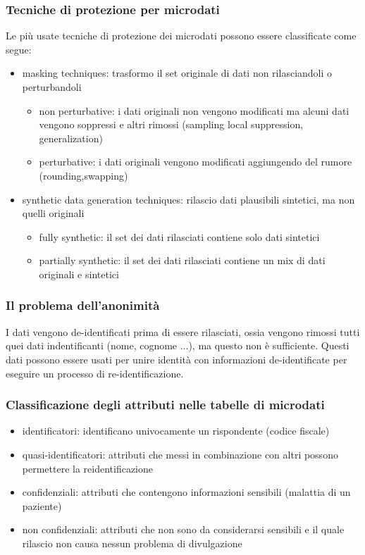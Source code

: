 \subsubsection{Tecniche di protezione per microdati}
Le più usate tecniche di protezione dei microdati possono essere classificate come segue:
\begin{itemize}
    \item masking techniques: trasformo il set originale di dati non rilasciandoli o perturbandoli
    \begin{itemize}
        \item non perturbative: i dati originali non vengono modificati ma alcuni dati vengono soppressi e altri rimossi (sampling local suppression, generalization)
        \item perturbative: i dati originali vengono modificati aggiungendo del rumore (rounding,swapping)
    \end{itemize}
    \item synthetic data generation techniques: rilascio dati plausibili sintetici, ma non quelli originali
    \begin{itemize}
        \item fully synthetic: il set dei dati rilasciati contiene solo dati sintetici
        \item partially synthetic: il set dei dati rilasciati contiene un mix di dati originali e sintetici
    \end{itemize}
\end{itemize}

\subsubsection{Il problema dell'anonimità}
I dati vengono de-identificati prima di essere rilasciati, ossia vengono rimossi tutti quei dati indentificanti (nome, cognome ...), ma questo non è sufficiente. Questi dati possono essere usati per unire identità con informazioni de-identificate per eseguire un processo di re-identificazione.

\subsubsection{Classificazione degli attributi nelle tabelle di microdati}
\begin{itemize}
    \item identificatori: identificano univocamente un rispondente (codice fiscale)
    \item quasi-identificatori: attributi che messi in combinazione con altri possono permettere la reidentificazione
    \item confidenziali: attributi che contengono informazioni sensibili (malattia di un paziente)
    \item non confidenziali: attributi che non sono da considerarsi sensibili e il quale rilascio non causa nessun problema di divulgazione
\end{itemize}

